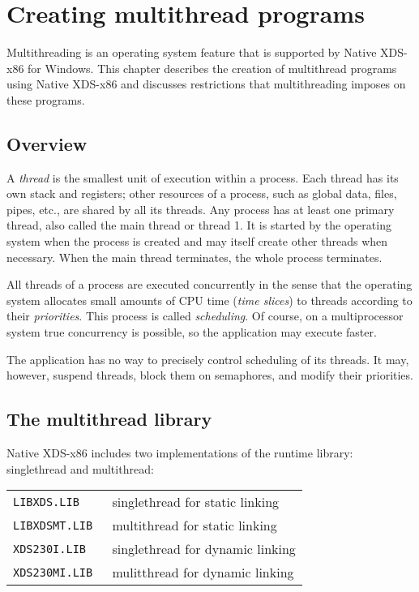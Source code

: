 \chapter{Creating multithread programs}
\label{threads}

Multithreading is an operating system feature that is supported by Native XDS-x86
for Windows. This chapter describes
the creation of multithread programs using Native XDS-x86 and discusses
restrictions that multithreading imposes on these programs.

\section{Overview}

A {\em thread} is the smallest unit of execution within a process.
Each thread has its own stack and registers; other resources
of a process, such as global data, files, pipes, etc., are shared by
all its threads. Any process has at least one primary thread, also
called the main thread or thread 1.
It is started by the operating system when the process is created
and may itself create other threads when necessary. When the main thread
terminates, the whole process terminates.

All threads of a process are executed concurrently in the sense that the
operating system allocates small amounts of CPU time ({\em time slices})
to threads according to their {\em priorities}. This process is called
{\em scheduling}. Of course, on a multiprocessor system true concurrency
is possible, so the application may execute faster.

The application has no way to precisely control scheduling of its threads.
It may, however, suspend threads, block them on semaphores, and %
modify their priorities.

\section{The multithread library}
\label{threads:mtlib}

Native XDS-x86 includes two implementations of the runtime library: singlethread
and multithread:

\begin{tabular}{ll}
\tt LIBXDS.LIB   & singlethread for static linking \\
\tt LIBXDSMT.LIB & multithread for static linking \\
\tt XDS230I.LIB  & singlethread for dynamic linking \\ %
\tt XDS230MI.LIB & mulitthread for dynamic linking
\end{tabular}

